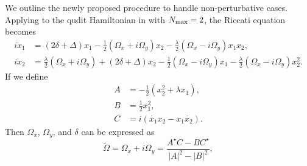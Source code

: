 We outline the newly proposed procedure to handle non-perturbative cases.
Applying to the qudit Hamiltonian in  with $N_{\rm{max}}=2$,
the Riccati equation becomes
\begin{equation}
  \begin{aligned}
    i\dot{x}_1 & = (2\delta+\Delta) x_1 - \frac{1}{2}(\Omega_x + i\Omega_y)x_2 - \frac{\lambda}{2}(\Omega_x - i\Omega_y)x_1 x_2,                                         \\
    i\dot{x}_2 & = \frac{\lambda}{2}(\Omega_x + i\Omega_y) + (2\delta+\Delta) x_2 - \frac{1}{2}(\Omega_x - i\Omega_y)x_1 - \frac{\lambda}{2}(\Omega_x - i\Omega_y)x_2^2.
  \end{aligned}
\end{equation}
If we define
\begin{equation}
  \begin{aligned}
    A & = -\frac{1}{2}(x_2^2+\lambda x_1), \\
    B & = \frac{1}{2}x_1^2,                \\
    C & = i(\dot{x_1}x_2-x_1\dot{x_2}).
  \end{aligned}
\end{equation}
Then $\Omega_x$, $\Omega_y$, and $\delta$ can be expressed as
\begin{equation}
  \tilde{\Omega} = \Omega_x+i\Omega_y = \dfrac{A^\star C - B C^\star}{|A|^2-|B|^2}, \label{eq:riccati_Omega}
\end{equation}

